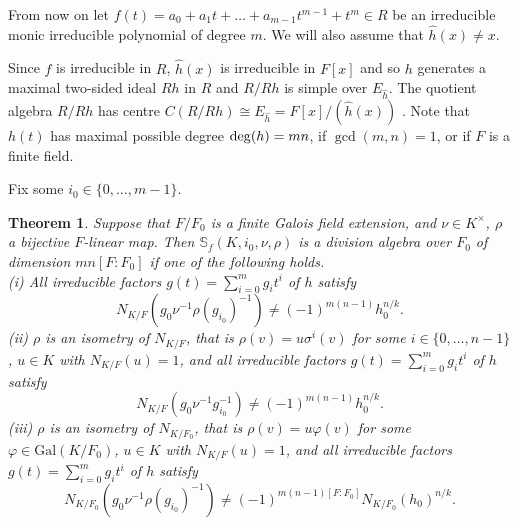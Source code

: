 \documentclass[12pt]{amsart}
\theoremstyle{plain}
\newtheorem{theorem}{Theorem}[section]
\theoremstyle{definition}
\numberwithin{equation}{section}
\numberwithin{figure}{section}
\newcommand{\Gal}{\mathrm{Gal}}
\begin{document}
 From now on let  $f(t)=a_0+a_1t+\dots+ a_{m-1} t^{m-1}+t^m \in R$ be an irreducible monic irreducible polynomial of degree $m$.
 We will also assume that $\hat{h}(x)\not=x$.

    Since $f$ is irreducible in $R$,  $\hat{h}(x)$ is irreducible in $F[x]$
    and so $h$ generates a maximal two-sided ideal $Rh$ in $R$
\cite[p.~16]{J96} and $R/Rh$ is simple over $ E_{\hat{h}}$.  The quotient algebra $R/Rh$ has centre $ C(R/Rh)\cong  E_{\hat{h}}=F[x]/ (\hat{h}(x) )$ \cite[Lemma 4.2]{GLN18}.
Note  that $h(t)$ has maximal possible degree ${\rm deg}(h)=mn$, if $\gcd (m,n)=1$, or if $F$ is a finite field.

Fix some $i_0\in \{0,\dots , m-1\}$.



\begin{theorem}\label{thm:mainI}
Suppose  that $F/F_0$ is a finite Galois field extension, and $\nu\in K^\times$, $\rho$ a bijective $F$-linear map.
 Then $\mathbb{S}_f(K,i_0,\nu,\rho)$  is a division algebra over $F_0$ of dimension $mn[F:F_0]$ if one of the following holds.
\\ (i) All irreducible factors $g(t)=\sum_{i=0}^{m} g_it^i$ of $h$   satisfy
 $$ N_{K/F}(g_0 \nu^{-1}\rho(g_{i_0})^{-1} )\not=(-1)^{m(n-1)}h_0^{n/k}.$$
 (ii)  $\rho$ is an isometry of $N_{K/F}$, that is $\rho(v)=u\sigma^i(v)$ for some $i\in\{0,\dots, n-1  \}$, $u\in K$ with $N_{K/F}(u)=1$, and  all irreducible factors $g(t)=\sum_{i=0}^{m} g_it^i$  of $h$   satisfy
$$ N_{K/F}(g_0 \nu^{-1}g_{i_0}^{-1} )\not=(-1)^{m(n-1)}h_0^{n/k}.$$
 (iii) $\rho$ is an isometry of $N_{K/F_0}$,  that is $\rho(v)=u\varphi(v)$ for some $\varphi\in \Gal(K/F_0)$, $u\in K$ with $N_{K/F}(u)=1$, and all irreducible factors $g(t)=\sum_{i=0}^{m} g_it^i$  of $h$  satisfy
 $$N_{K/F_0}(g_0 \nu^{-1}\rho(g_{i_0})^{-1} )\not=(-1)^{m(n-1)[F:F_0]}N_{K/F_0}(h_0)^{n/k}.$$
\end{theorem}
\end{document}

